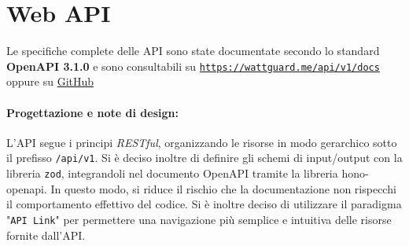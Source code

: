 \section{Web API}
\label{chap:webApi}

Le specifiche complete delle API sono state documentate secondo lo standard \textbf{OpenAPI 3.1.0} e sono consultabili su \texttt{\href{https://wattguard.me/api/v1/docs}{https://wattguard.me/api/v1/docs}}
oppure su \href{https://raw.githubusercontent.com/alterax05/wattguard-ing-sw/refs/heads/main/docs/api-doc.yaml}{GitHub}

\paragraph{Progettazione e note di design: }
L'API segue i principi \emph{RESTful}, organizzando le risorse in modo gerarchico sotto il prefisso \texttt{/api/v1}. 
Si è deciso inoltre di definire gli schemi di input/output con la libreria \texttt{zod}, integrandoli nel documento OpenAPI tramite la libreria hono-openapi.
In questo modo, si riduce il rischio che la documentazione non rispecchi il comportamento effettivo del codice.
Si è inoltre deciso di utilizzare il paradigma "\texttt{API Link}" per permettere una navigazione più semplice e intuitiva delle risorse fornite dall'API.

\inputminted[breaklines, breakanywhere]{yaml}{chapter/api-doc.yaml}